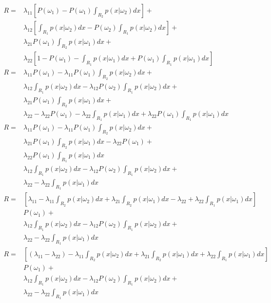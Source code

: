 \documentclass{IEEEtran}
\begin{document}
\begin{align*}
    R = & \lambda_{11}\left[P(\omega_1) - P(\omega_1)\int_{R_2}p(x|\omega_2)dx \right] + \\
        & \lambda_{12}\left[\int_{R_1}p(x|\omega_2)dx - P(\omega_2)\int_{R_1}p(x|\omega_2)dx \right] + \\
        & \lambda_{21}P(\omega_1)\int_{R_2}p(x|\omega_1)dx + \\
        & \lambda_{22}\left[1 - P(\omega_1) - \int_{R_1}p(x|\omega_1)dx + P(\omega_1)\int_{R_1}p(x|\omega_1)dx \right] \\
    R = & \lambda_{11}P(\omega_1) - \lambda_{11}P(\omega_1)\int_{R_2}p(x|\omega_2)dx + \\
        & \lambda_{12}\int_{R_1}p(x|\omega_2)dx - \lambda_{12}P(\omega_2)\int_{R_1}p(x|\omega_2)dx + \\
        & \lambda_{21}P(\omega_1)\int_{R_2}p(x|\omega_1)dx + \\
        & \lambda_{22} - \lambda_{22}P(\omega_1) - \lambda_{22}\int_{R_1}p(x|\omega_1)dx + \lambda_{22}P(\omega_1)\int_{R_1}p(x|\omega_1)dx \\
    R = & \lambda_{11}P(\omega_1) - \lambda_{11}P(\omega_1)\int_{R_2}p(x|\omega_2)dx + \\
        & \lambda_{21}P(\omega_1)\int_{R_2}p(x|\omega_1)dx - \lambda_{22}P(\omega_1) + \\
        & \lambda_{22}P(\omega_1)\int_{R_1}p(x|\omega_1)dx \\
        & \lambda_{12}\int_{R_1}p(x|\omega_2)dx - \lambda_{12}P(\omega_2)\int_{R_1}p(x|\omega_2)dx + \\
        & \lambda_{22} - \lambda_{22}\int_{R_1}p(x|\omega_1)dx \\
    R = & \left[\lambda_{11} - \lambda_{11}\int_{R_2}p(x|\omega_2)dx + \lambda_{21}\int_{R_2}p(x|\omega_1)dx - \lambda_{22} + \lambda_{22}\int_{R_1}p(x|\omega_1)dx \right] \\
        & P(\omega_1) +\\
        & \lambda_{12}\int_{R_1}p(x|\omega_2)dx - \lambda_{12}P(\omega_2)\int_{R_1}p(x|\omega_2)dx + \\
        & \lambda_{22} - \lambda_{22}\int_{R_1}p(x|\omega_1)dx \\
    R = & \left[\left(\lambda_{11} - \lambda_{22}\right) - \lambda_{11}\int_{R_2}p(x|\omega_2)dx + \lambda_{21}\int_{R_2}p(x|\omega_1)dx + \lambda_{22}\int_{R_1}p(x|\omega_1)dx \right] \\
        & P(\omega_1) +\\
        & \lambda_{12}\int_{R_1}p(x|\omega_2)dx - \lambda_{12}P(\omega_2)\int_{R_1}p(x|\omega_2)dx + \\
        & \lambda_{22} - \lambda_{22}\int_{R_1}p(x|\omega_1)dx
\end{align*}
\end{document}
